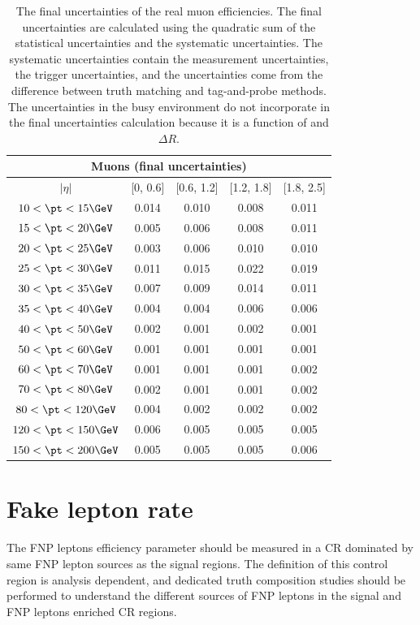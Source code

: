 \begin{table}[htbp]
\begin{center}
\begin{tabular}{ccccc}
\hline
\hline
\multicolumn{5}{c}{Muons (final uncertainties)}\\
\hline
$|\eta|$ & [0, 0.6] & [0.6, 1.2] & [1.2, 1.8] & [1.8, 2.5]\\
\hline
$10<\pt<15 \GeV$ & 0.014 & 0.010 & 0.008 & 0.011\\
$15<\pt<20 \GeV$ & 0.005 & 0.006 & 0.008 & 0.011\\
$20<\pt<25 \GeV$ & 0.003 & 0.006 & 0.010 & 0.010\\
$25<\pt<30 \GeV$ & 0.011 & 0.015 & 0.022 & 0.019\\
$30<\pt<35 \GeV$ & 0.007 & 0.009 & 0.014 & 0.011\\
$35<\pt<40 \GeV$ & 0.004 & 0.004 & 0.006 & 0.006\\
$40<\pt<50 \GeV$ & 0.002 & 0.001 & 0.002 & 0.001\\
$50<\pt<60 \GeV$ & 0.001 & 0.001 & 0.001 & 0.001\\
$60<\pt<70 \GeV$ & 0.001 & 0.001 & 0.001 & 0.002\\
$70<\pt<80 \GeV$ & 0.002 & 0.001 & 0.001 & 0.002\\
$80<\pt<120 \GeV$ & 0.004 & 0.002 & 0.002 & 0.002\\
$120<\pt<150 \GeV$ & 0.006 & 0.005 & 0.005 & 0.005\\
$150<\pt<200 \GeV$ & 0.005 & 0.005 & 0.005 & 0.006\\
\hline
\hline
\end{tabular}
\caption{The final uncertainties of the real muon efficiencies.
The final uncertainties are calculated using the quadratic sum of the statistical uncertainties and the systematic uncertainties.
The systematic uncertainties contain the measurement uncertainties, the trigger uncertainties, and the uncertainties come from the difference between truth matching and tag-and-probe methods.
The uncertainties in the busy environment do not incorporate in the final uncertainties calculation because it is a function of \pT and $\Delta R$.
}
\label{tab:RLE_final_uncertainties_muon}
\end{center}
\end{table}



\section{Fake lepton rate}

The FNP leptons efficiency parameter should be measured in a CR dominated by same FNP lepton sources as the signal regions. The definition of this control region is analysis dependent, and dedicated truth composition studies should be performed to understand the different sources of FNP leptons in the signal and FNP leptons enriched CR regions. 

